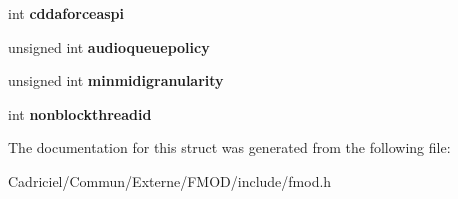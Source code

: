 \begin{DoxyCompactItemize}
\item 
int {\bfseries cddaforceaspi}\hypertarget{struct_f_m_o_d___c_r_e_a_t_e_s_o_u_n_d_e_x_i_n_f_o_a6eba4eee8813485c49042453ffdbe9bf}{}\label{struct_f_m_o_d___c_r_e_a_t_e_s_o_u_n_d_e_x_i_n_f_o_a6eba4eee8813485c49042453ffdbe9bf}

\item 
unsigned int {\bfseries audioqueuepolicy}\hypertarget{struct_f_m_o_d___c_r_e_a_t_e_s_o_u_n_d_e_x_i_n_f_o_a23344f4eafd6e30b53443c6e63045684}{}\label{struct_f_m_o_d___c_r_e_a_t_e_s_o_u_n_d_e_x_i_n_f_o_a23344f4eafd6e30b53443c6e63045684}

\item 
unsigned int {\bfseries minmidigranularity}\hypertarget{struct_f_m_o_d___c_r_e_a_t_e_s_o_u_n_d_e_x_i_n_f_o_accd465df1d73435daae0d2ef87026362}{}\label{struct_f_m_o_d___c_r_e_a_t_e_s_o_u_n_d_e_x_i_n_f_o_accd465df1d73435daae0d2ef87026362}

\item 
int {\bfseries nonblockthreadid}\hypertarget{struct_f_m_o_d___c_r_e_a_t_e_s_o_u_n_d_e_x_i_n_f_o_a99017c1720cfae07e5bd5abacf3ac2a7}{}\label{struct_f_m_o_d___c_r_e_a_t_e_s_o_u_n_d_e_x_i_n_f_o_a99017c1720cfae07e5bd5abacf3ac2a7}

\end{DoxyCompactItemize}


The documentation for this struct was generated from the following file\+:\begin{DoxyCompactItemize}
\item 
Cadriciel/\+Commun/\+Externe/\+F\+M\+O\+D/include/fmod.\+h\end{DoxyCompactItemize}
